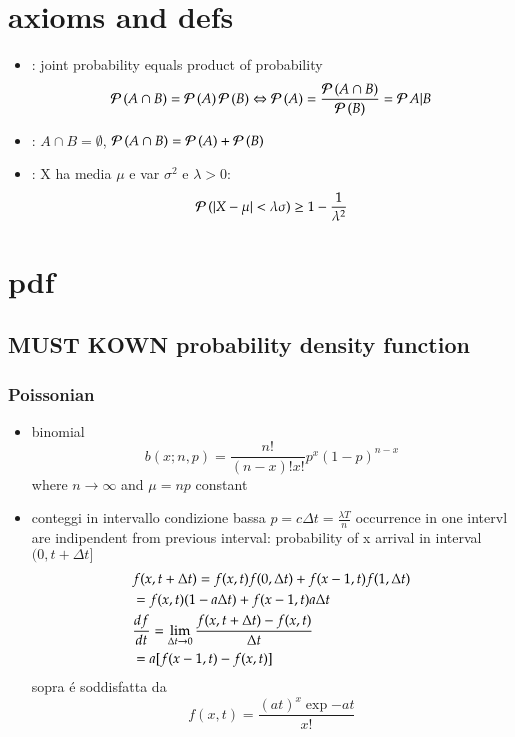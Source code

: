 \documentclass[main.tex]{subfiles}
\begin{document}
\chapter{axioms and defs}
\begin{itemize}
\item {}: joint probability equals product of probability
\[\prob{(A\cap B)}=\prob{(A)}\prob{(B)}\Leftrightarrow \prob{(A)}=\frac{\prob{(A\cap B)}}{\prob{(B)}}=\prob{A|B}\]
\item {}: $A\cap B=\emptyset$, $\prob{(A\cap B)}=\prob{(A)}+\prob{(B)}$
\item {}: X ha media $\mu$ e var $\sigma^2$ e $\lambda>0$:
\[\prob{(|X-\mu|<\lambda\sigma)}\geq1-\frac{1}{\lambda^2}\]

\end{itemize}

\chapter{pdf}

\section{MUST KOWN probability density function}

\subsection{Poissonian}

\begin{itemize}
\item binomial
\[b(x;n,p)=\frac{n!}{(n-x)!x!}p^x(1-p)^{n-x}\]
where $n\to\infty$ and $\mu=np$ constant

\item conteggi in intervallo condizione bassa $p=c\Delta t=\frac{\lambda T}{n}$ occurrence in one intervl are indipendent from previous interval: probability of x arrival in interval $(0,t+\Delta t]$
\begin{align*}
&f(x,t+\Delta t)=f(x,t)f(0,\Delta t)+f(x-1,t)f(1,\Delta t)\\
&=f(x,t)(1-a\Delta t)+f(x-1,t)a\Delta t\\
&\TDy{t}{f}=\lim_{\Delta t\to0}\frac{f(x,t+\Delta t)-f(x,t)}{\Delta t}\\
&=a[f(x-1,t)-f(x,t)]
\end{align*}
sopra \'e soddisfatta da
\[f(x,t)=\frac{(at)^x\exp{-at}}{x!}\]
\end{itemize}
\end{document}

